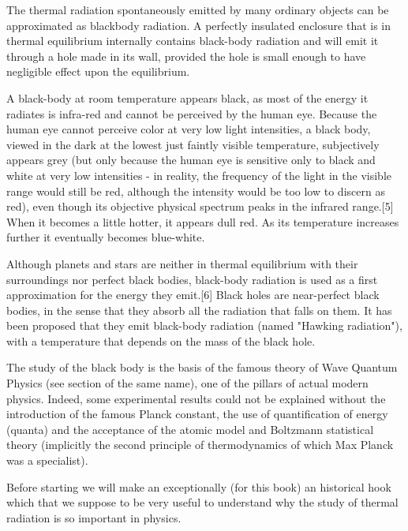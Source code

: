 	The thermal radiation spontaneously emitted by many ordinary objects can be approximated as blackbody radiation. A perfectly insulated enclosure that is in thermal equilibrium internally contains black-body radiation and will emit it through a hole made in its wall, provided the hole is small enough to have negligible effect upon the equilibrium.
	
	A black-body at room temperature appears black, as most of the energy it radiates is infra-red and cannot be perceived by the human eye. Because the human eye cannot perceive color at very low light intensities, a black body, viewed in the dark at the lowest just faintly visible temperature, subjectively appears grey (but only because the human eye is sensitive only to black and white at very low intensities - in reality, the frequency of the light in the visible range would still be red, although the intensity would be too low to discern as red), even though its objective physical spectrum peaks in the infrared range.[5] When it becomes a little hotter, it appears dull red. As its temperature increases further it eventually becomes blue-white.
	
	Although planets and stars are neither in thermal equilibrium with their surroundings nor perfect black bodies, black-body radiation is used as a first approximation for the energy they emit.[6] Black holes are near-perfect black bodies, in the sense that they absorb all the radiation that falls on them. It has been proposed that they emit black-body radiation (named "Hawking radiation"), with a temperature that depends on the mass of the black hole.
	
	The study of the black body is the basis of the famous theory of Wave Quantum Physics (see section of the same name), one of the pillars of actual modern physics. Indeed, some experimental results could not be explained without the introduction of the famous Planck constant, the use of quantification of energy (quanta) and the acceptance of the atomic model and Boltzmann statistical theory (implicitly the second principle of thermodynamics of which Max Planck was a specialist).

	Before starting we will make an exceptionally (for this book) an historical hook which that we suppose to be very useful to understand why the study of thermal radiation is so important in physics.

